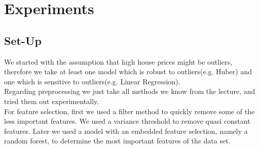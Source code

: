 \documentclass[a4paper,12pt]{article}
\newcommand{\initials}[1]{\marginpar{\quad\texttt{#1}}}
\begin{document}
\section{Experiments}

\subsection{Set-Up}
\initials{LB}
We started with the assumption that high house prices might be outliers, therefore we take at least one model which is robust to outliers(e.g. Huber) and one which is sensitive to outliers(e.g. Linear Regression).\\
Regarding preprocessing we just take all methods we know from the lecture, and tried them out experimentally.\\
For feature selection, first we used a filter method to quickly remove some of the less important features. We used a variance threshold to remove quasi constant features. Later we used a model with an embedded feature selection, namely a random forest, to determine the most important features of the data set.
\end{document}
